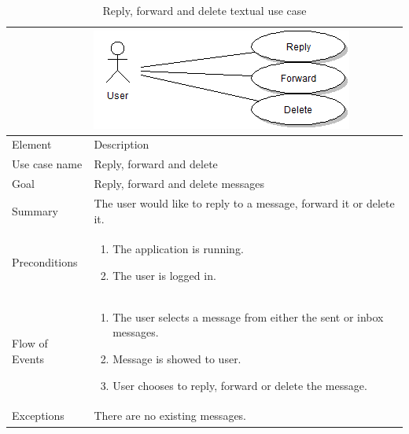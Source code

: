 \begin{table}
\begin{tabular}{p{3cm}p{12cm}}
& \includegraphics{reply_forward_delete}\\ \hline
Element & Description \\ \hline
Use case name & Reply, forward and delete \\
Goal & Reply, forward and delete messages\\
Summary & The user would like to reply to a message, forward it or delete it. \\
Preconditions &
\begin{enumerate}
\item{}The application is running.
\item{}The user is logged in.
\end{enumerate} \\ \hline
Flow of Events &
\begin{enumerate}
\item{}The user selects a message from either the sent or inbox messages.
\item{}Message is showed to user.
\item{}User chooses to reply, forward or delete the message. 
\end{enumerate} \\ \hline
Exceptions & There are no existing messages.
\end{tabular}
\caption{Reply, forward and delete textual use case} \label{tab:viewmessages}
\end{table}

